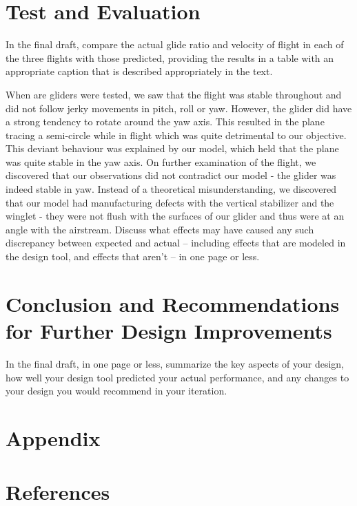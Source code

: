 \documentclass{../aiaa-pretty}
\begin{document}
\section{Test and Evaluation}

In the final draft, compare the actual glide ratio and velocity of flight in each of the three flights with those predicted, providing the results in a table with an appropriate caption that is described appropriately in the text.

When are gliders were tested, we saw that the flight was stable throughout and did not follow jerky movements in pitch, roll or yaw. However, the glider did have a strong tendency to rotate around the yaw axis. This resulted in the plane tracing a semi-circle while in flight which was quite detrimental to our objective. This deviant behaviour was explained by our model, which held that the plane was quite stable in the yaw axis. On further examination of the flight, we discovered that our observations did not contradict our model - the glider was indeed stable in yaw. Instead of a theoretical misunderstanding, we discovered that our model had manufacturing defects with the vertical stabilizer and the winglet - they were not flush with the surfaces of our glider and thus were at an angle with the airstream.
Discuss what effects may have caused any such discrepancy between expected and actual – including effects that are modeled in the design tool, and effects that aren’t – in one page or less.

\section{Conclusion and Recommendations for Further Design Improvements}
In the final draft, in one page or less, summarize the key aspects of your design, how well your design tool predicted your actual performance, and any changes to your design you would recommend in your iteration.

\section{Appendix}

\section{References}
\end{document}

